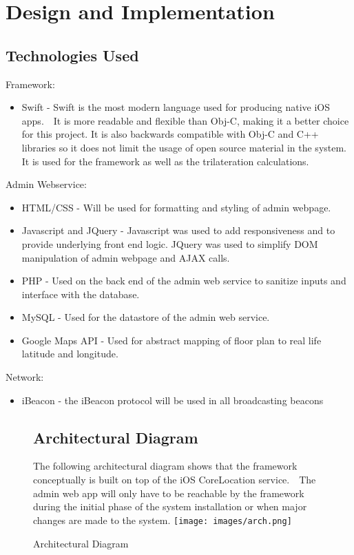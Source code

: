 \chapter{Design and Implementation}

\section{Technologies Used}

Framework:

\begin{itemize}
\item Swift - Swift is the most modern language used for producing native iOS apps.  It is more readable and flexible than Obj-C, making it a better choice for this project. It is also backwards compatible with Obj-C and C++ libraries so it does not limit the usage of open source material in the system. It is used for the framework as well as the trilateration calculations.
\end{itemize}

Admin Webservice:

\begin{itemize}
\item HTML/CSS - Will be used for formatting and styling of admin webpage.
\item Javascript and JQuery - Javascript was used to add responsiveness and to provide underlying front end logic. JQuery was used to simplify DOM manipulation of admin webpage and AJAX calls.
\item PHP - Used on the back end of the admin web service to sanitize inputs and interface with the database.
\item MySQL - Used for the datastore of the admin web service.
\item Google Maps API - Used for abstract mapping of floor plan to real life latitude and longitude.
\end{itemize}

Network:
\begin{itemize}
\item iBeacon - the iBeacon protocol will be used in all broadcasting beacons
\end{itemize}

\begin{figure}
\section{Architectural Diagram}
The following architectural diagram shows that the framework conceptually is built on top of the iOS CoreLocation service.  The admin web app will only have to be reachable by the framework during the initial phase of the system installation or when major changes are made to the system.
\newline
\texttt{[image: images/arch.png]}
\caption{Architectural Diagram}
\end{figure}
